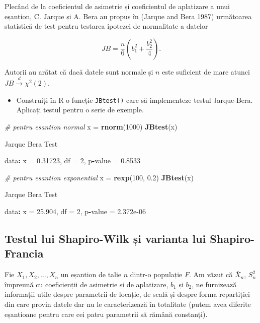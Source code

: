 \documentclass[]{article}
\newenvironment{Shaded}{\begin{snugshade}}{\end{snugshade}}
\newcommand{\KeywordTok}[1]{\textcolor[rgb]{0.13,0.29,0.53}{\textbf{#1}}}
\newcommand{\DecValTok}[1]{\textcolor[rgb]{0.00,0.00,0.81}{#1}}
\newcommand{\FloatTok}[1]{\textcolor[rgb]{0.00,0.00,0.81}{#1}}
\newcommand{\StringTok}[1]{\textcolor[rgb]{0.31,0.60,0.02}{#1}}
\newcommand{\CommentTok}[1]{\textcolor[rgb]{0.56,0.35,0.01}{\textit{#1}}}
\newcommand{\OperatorTok}[1]{\textcolor[rgb]{0.81,0.36,0.00}{\textbf{#1}}}
\newcommand{\NormalTok}[1]{#1}
\newenvironment{frshaded*}{%
  \def\FrameCommand{\fboxrule=\FrameRule\fboxsep=\FrameSep \fcolorbox{framecolor}{shadecolor1}}%
  \MakeFramed {\advance\hsize-\width \FrameRestore}}%
{\endMakeFramed}
\newenvironment{rmdblock}[1]
  {\begin{frshaded*}
  \begin{itemize}
  \renewcommand{\labelitemi}{
    \raisebox{-.7\height}[0pt][0pt]{
      {\setkeys{Gin}{width=2em,keepaspectratio}\texttt{[image: images/icons/\#1]}}
    }
  }
  \item
  }
  {
  \end{itemize}
  \end{frshaded*}
  }
\newenvironment{rmdexercise}
  {\begin{rmdblock}{exercise}}
  {\end{rmdblock}}
\begin{document}
Plecând de la coeficientul de asimetrie și coeficientul de aplatizare a
unui eșantion, C. Jarque și A. Bera au propus în (Jarque and Bera 1987)
următoarea statistică de test pentru testarea ipotezei de normalitate a
datelor

\[
  JB = \frac{n}{6}\left(b_1^2 + \frac{b_2^2}{4}\right).
\]

Autorii au arătat că dacă datele sunt normale și \(n\) este suficient de
mare atunci \(JB\overset{d}{\to}\chi^2(2)\).

\begin{rmdexercise}
Construiți în R o funcție \texttt{JBtest()} care să implementeze testul
Jarque-Bera. Aplicați testul pentru o serie de exemple.
\end{rmdexercise}

\begin{Shaded}
\begin{Highlighting}[]
\CommentTok{# pentru esantion normal }
\NormalTok{x =}\StringTok{ }\KeywordTok{rnorm}\NormalTok{(}\DecValTok{1000}\NormalTok{)}
\KeywordTok{JBtest}\NormalTok{(x)}

\NormalTok{    Jarque Bera Test}

\NormalTok{data}\OperatorTok{:}\StringTok{  }\NormalTok{x}
\NormalTok{=}\StringTok{ }\FloatTok{0.31723}\NormalTok{, df =}\StringTok{ }\DecValTok{2}\NormalTok{, p}\OperatorTok{-}\NormalTok{value =}\StringTok{ }\FloatTok{0.8533}

\CommentTok{# pentru esantion exponential  }
\NormalTok{x =}\StringTok{ }\KeywordTok{rexp}\NormalTok{(}\DecValTok{100}\NormalTok{, }\FloatTok{0.2}\NormalTok{)}
\KeywordTok{JBtest}\NormalTok{(x)}

\NormalTok{    Jarque Bera Test}

\NormalTok{data}\OperatorTok{:}\StringTok{  }\NormalTok{x}
\NormalTok{=}\StringTok{ }\FloatTok{25.904}\NormalTok{, df =}\StringTok{ }\DecValTok{2}\NormalTok{, p}\OperatorTok{-}\NormalTok{value =}\StringTok{ }\FloatTok{2.372e-06}
\end{Highlighting}
\end{Shaded}

\subsection{Testul lui Shapiro-Wilk și varianta lui
Shapiro-Francia}\label{testul-lui-shapiro-wilk-si-varianta-lui-shapiro-francia}

Fie \(X_1, X_2, \ldots, X_n\) un eșantion de talie \(n\) dintr-o
populație \(F\). Am văzut că \(\bar{X}_n\), \(S_n^2\) împreună cu
coeficienții de asimetrie și de aplatizare, \(b_1\) și \(b_2\), ne
furnizează informații utile despre parametrii de locație, de scală și
despre forma repartiției din care provin datele dar nu le caracterizează
în totalitate (putem avea diferite eșantioane pentru care cei patru
parametrii să rămână constanți).
\end{document}

